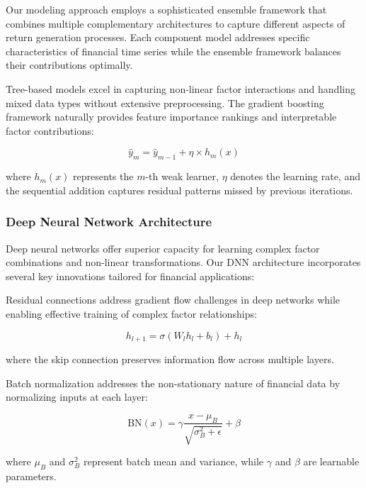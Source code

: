 \documentclass[conference]{IEEEtran}
\begin{document}
Our modeling approach employs a sophisticated ensemble framework that combines multiple complementary architectures to capture different aspects of return generation processes. Each component model addresses specific characteristics of financial time series while the ensemble framework balances their contributions optimally.

Tree-based models excel in capturing non-linear factor interactions and handling mixed data types without extensive preprocessing. The gradient boosting framework naturally provides feature importance rankings and interpretable factor contributions:

\begin{equation}
\hat{y}_m = \hat{y}_{m-1} + \eta \times h_m(x)
\end{equation}

where $h_m(x)$ represents the $m$-th weak learner, $\eta$ denotes the learning rate, and the sequential addition captures residual patterns missed by previous iterations.

\subsubsection{Deep Neural Network Architecture}

Deep neural networks offer superior capacity for learning complex factor combinations and non-linear transformations. Our DNN architecture incorporates several key innovations tailored for financial applications:

Residual connections address gradient flow challenges in deep networks while enabling effective training of complex factor relationships:

\begin{equation}
h_{l+1} = \sigma(W_l h_l + b_l) + h_l
\end{equation}

where the skip connection preserves information flow across multiple layers.

Batch normalization addresses the non-stationary nature of financial data by normalizing inputs at each layer:

\begin{equation}
\text{BN}(x) = \gamma \frac{x - \mu_B}{\sqrt{\sigma_B^2 + \epsilon}} + \beta
\end{equation}

where $\mu_B$ and $\sigma_B^2$ represent batch mean and variance, while $\gamma$ and $\beta$ are learnable parameters.
\end{document}
